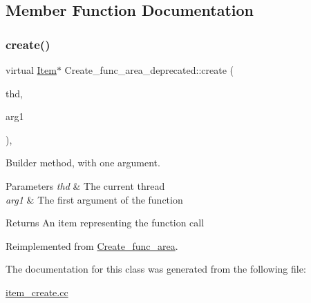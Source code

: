 \subsection{Member Function Documentation}
\mbox{\label{classCreate__func__area__deprecated_a8f1158f60042c56c8958242d069d65b1}} 
\subsubsection{\texorpdfstring{create()}{create()}}
{\footnotesize\ttfamily virtual \mbox{\hyperlink{classItem}{Item}}$\ast$ Create\+\_\+func\+\_\+area\+\_\+deprecated\+::create (\begin{DoxyParamCaption}\item[{T\+HD $\ast$}]{thd,  }\item[{\mbox{\hyperlink{classItem}{Item}} $\ast$}]{arg1 }\end{DoxyParamCaption})\hspace{0.3cm}{\ttfamily [inline]}, {\ttfamily [virtual]}}

Builder method, with one argument. 
\begin{DoxyParams}{Parameters}
{\em thd} & The current thread \\
\hline
{\em arg1} & The first argument of the function \\
\hline
\end{DoxyParams}
\begin{DoxyReturn}{Returns}
An item representing the function call 
\end{DoxyReturn}


Reimplemented from \mbox{\hyperlink{classCreate__func__area_aa99a51d37fda13a4759b9592b72c4fec}{Create\+\_\+func\+\_\+area}}.



The documentation for this class was generated from the following file\+:\begin{DoxyCompactItemize}
\item 
\mbox{\hyperlink{item__create_8cc}{item\+\_\+create.\+cc}}\end{DoxyCompactItemize}
